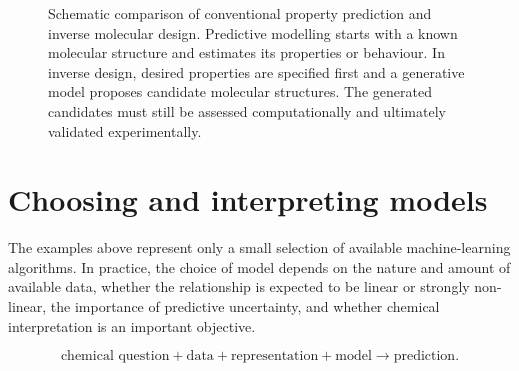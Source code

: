 \begin{figure}[htbp]
{%
  }

  \caption{
    Schematic comparison of conventional property prediction and inverse molecular design.
    Predictive modelling starts with a known molecular structure and estimates its properties or behaviour.
    In inverse design, desired properties are specified first and a generative model proposes candidate molecular structures.
    The generated candidates must still be assessed computationally and ultimately validated experimentally.
  }
  \label{fig2-14:generative-inverse-design}
\end{figure}


\section{Choosing and interpreting models}

The examples above represent only a small selection of available machine-learning algorithms.
In practice, the choice of model depends on the nature and amount of available data, whether the relationship is expected to be linear or strongly non-linear, the importance of predictive uncertainty, and whether chemical interpretation is an important objective.

\begin{equation}
  \text{chemical question} + \text{data} + \text{representation} + \text{model} \longrightarrow \text{prediction}.
\end{equation}

